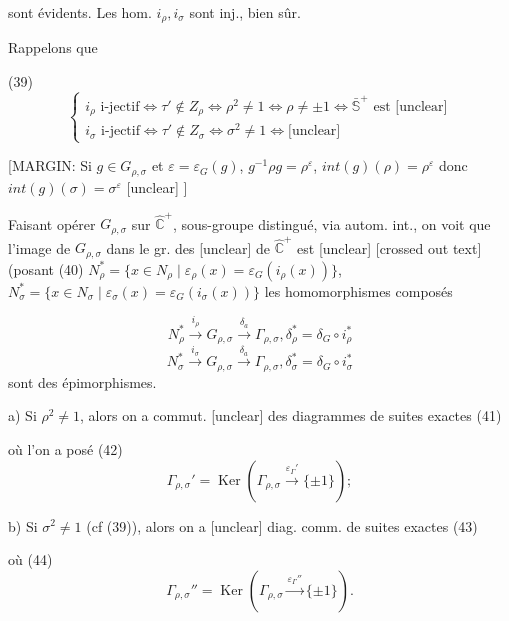 \begin{enumerate}
sont évidents. Les hom. $i_\rho, i_\sigma$ sont inj., bien sûr.

Rappelons que

(39)
$$
\begin{cases}
i_\rho \text{ i-jectif} \iff \tau' \notin Z_\rho \iff \rho^2 \neq 1 \iff \rho \neq \pm 1 \iff \bar{\mathbb{S}}^+ \text{ est [unclear]} \\
i_\sigma \text{ i-jectif} \iff \tau' \notin Z_\sigma \iff \sigma^2 \neq 1 \iff \text{[unclear]}
\end{cases}
$$

\newpage


[MARGIN: Si $g \in G_{\rho,\sigma}$ et $\varepsilon = \varepsilon_G(g)$, $g^{-1} \rho g = \rho^\varepsilon$, $int(g)(\rho) = \rho^\varepsilon$ donc $int(g)(\sigma) = \sigma^\varepsilon$
[unclear]
]

Faisant opérer $G_{\rho,\sigma}$ sur $\widehat{\mathbb{C}}^+$, sous-groupe distingué, via autom. int., on voit que l'image de $G_{\rho,\sigma}$ dans le gr. des [unclear] de $\widehat{\mathbb{C}}^+$ est [unclear]
[crossed out text]
(posant
(40) $N_\rho^* = \{ x \in N_\rho \mid \varepsilon_\rho(x) = \varepsilon_G(i_\rho(x)) \}$, $N_\sigma^* = \{ x \in N_\sigma \mid \varepsilon_\sigma(x) = \varepsilon_G(i_\sigma(x)) \}$
les homomorphismes composés

$$ N_\rho^* \xrightarrow{i_\rho} G_{\rho,\sigma} \xrightarrow{\delta_a} \Gamma_{\rho,\sigma} , \delta_\rho^* = \delta_G \circ i_\rho^* $$
$$ N_\sigma^* \xrightarrow{i_\sigma} G_{\rho,\sigma} \xrightarrow{\delta_a} \Gamma_{\rho,\sigma} , \delta_\sigma^* = \delta_G \circ i_\sigma^* $$
sont des épimorphismes.

a) Si $\rho^2 \neq 1$, alors on a commut. [unclear] des
diagrammes de suites exactes
(41)
où l'on a posé
(42) $$ \Gamma_{\rho,\sigma}' = \operatorname{Ker}(\Gamma_{\rho,\sigma} \xrightarrow{\varepsilon_\Gamma'} \{\pm 1\}) ; $$

b) Si $\sigma^2 \neq 1$ (cf (39)), alors on a [unclear] diag. comm. de suites exactes
(43)
où
(44) $$ \Gamma_{\rho,\sigma}'' = \operatorname{Ker}(\Gamma_{\rho,\sigma} \xrightarrow{\varepsilon_\Gamma''} \{\pm 1\}) . $$


\end{enumerate}
